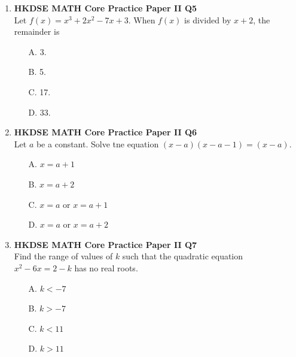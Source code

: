 \documentclass[12pt]{article}
\begin{document}
\begin{enumerate}
	\item \textbf{HKDSE MATH Core Practice Paper II Q5}\\
	Let $f(x) = x^3 + 2x^2 - 7x + 3$. When $f(x)$ is divided by $x + 2$, the remainder is 
	\begin{enumerate}
		\item[A.] 3.
		\item[B.] 5.
		\item[C.] 17.
		\item[D.] 33.
	\end{enumerate}

	\item \textbf{HKDSE MATH Core Practice Paper II Q6}\\
	Let $a$ be a constant. Solve tne equation $(x - a)(x - a - 1) = (x - a)$.
	\begin{enumerate}
		\item[A.] $x = a + 1$
		\item[B.] $x = a + 2$
		\item[C.] $x = a$ or $x = a + 1$
		\item[D.] $x = a$ or $x = a + 2$
	\end{enumerate}

	\item \textbf{HKDSE MATH Core Practice Paper II Q7}\\
	Find the range of values of $k$ such that the quadratic equation $x^2 - 6x = 2 - k$ has no real roots.
	\begin{enumerate}
		\item[A.] $k < -7$
		\item[B.] $k > -7$
		\item[C.] $k < 11$
		\item[D.] $k > 11$
	\end{enumerate}


\end{enumerate}
\end{document}
